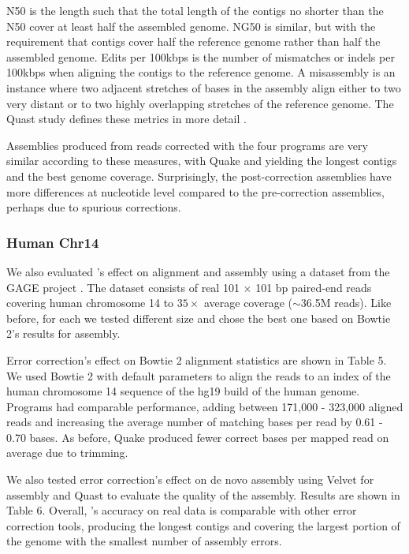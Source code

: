 \documentclass{bmcart}
\begin{document}
N50 is the length such that the total length of the contigs no shorter than the N50 cover at least half the assembled genome.  NG50 is similar, but with the requirement that contigs cover half the reference genome rather than half the assembled genome. Edits per 100kbps is the number of mismatches or indels per 100kbps when aligning the contigs to the reference genome. A misassembly is an instance where two adjacent stretches of bases in the assembly align either to two very distant or to two highly overlapping stretches of the reference genome.  The Quast study defines these metrics in more detail \cite{gurevich2013quast}.

Assemblies produced from reads corrected with the four programs are very similar according to these measures, with Quake and \tool yielding the longest contigs and the best genome coverage. Surprisingly, the post-correction assemblies have more differences at nucleotide level compared to the pre-correction assemblies, perhaps due to spurious corrections.

\subsubsection*{Human Chr14}
We also evaluated \tool's effect on alignment and assembly using a dataset from the GAGE project \cite{salzberg2012gage}.  The dataset consists of real 101 $\times$ 101 bp paired-end reads covering human chromosome 14 to $35\times$ average coverage ($\sim$36.5M reads).  Like before, for each \tool we tested different \kmer size and chose the best one based on Bowtie 2's results for assembly.

Error correction's effect on Bowtie 2 alignment statistics are shown in Table 5.  We used Bowtie 2 with default parameters to align the reads to an index of the human chromosome 14 sequence of the hg19 build of the human genome.  Programs had comparable performance, adding between 171,000 - 323,000 aligned reads and increasing the average number of matching bases per read by 0.61 - 0.70 bases. As before, Quake produced fewer correct bases per mapped read on average due to trimming.   



We also tested error correction's effect on de novo assembly using Velvet for assembly and Quast to evaluate the quality of the assembly.  Results are shown in Table 6.  Overall, \tool's accuracy on real data is comparable with other error correction tools, producing the longest contigs and covering the largest portion of the genome with the smallest number of assembly errors.   
\end{document}
